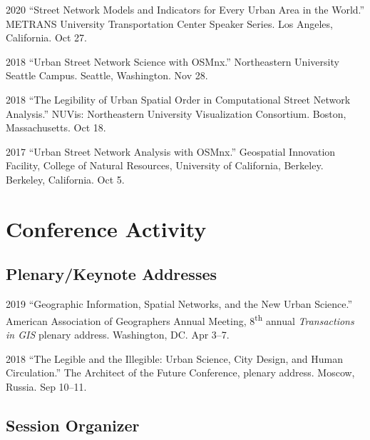 \documentclass[12pt,letterpaper]{report}
\begin{document}
    \begin{tablist}

        \item[2020] \tab \enquote{Street Network Models and Indicators for Every Urban Area in the World.} METRANS University Transportation Center Speaker Series. Los Angeles, California. Oct 27.

        \item[2018] \tab \enquote{Urban Street Network Science with OSMnx.} Northeastern University Seattle Campus. Seattle, Washington. Nov 28.

        \item[2018] \tab \enquote{The Legibility of Urban Spatial Order in Computational Street Network Analysis.} NUVis: Northeastern University Visualization Consortium. Boston, Massachusetts. Oct 18.

        \item[2017] \tab \enquote{Urban Street Network Analysis with OSMnx.} Geospatial Innovation Facility, College of Natural Resources, University of California, Berkeley. Berkeley, California. Oct 5.

    \end{tablist}


    \section*{Conference Activity}

    \subsection*{Plenary/Keynote Addresses}

    \begin{tablist}

        \item[2019] \tab \enquote{Geographic Information, Spatial Networks, and the New Urban Science.} American Association of Geographers Annual Meeting, 8\textsuperscript{th} annual \emph{Transactions in GIS} plenary address. Washington, DC. Apr 3--7.

        \item[2018] \tab \enquote{The Legible and the Illegible: Urban Science, City Design, and Human Circulation.} The Architect of the Future Conference, plenary address. Moscow, Russia. Sep 10--11.

    \end{tablist}

    \subsection*{Session Organizer}
\end{document}
